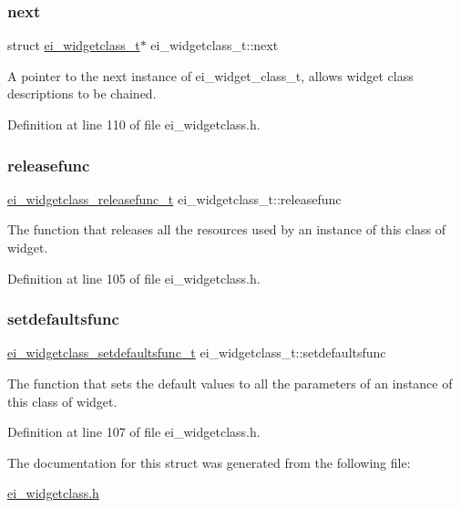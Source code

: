 \subsubsection{\texorpdfstring{next}{next}}
{\footnotesize\ttfamily struct \hyperlink{structei__widgetclass__t}{ei\+\_\+widgetclass\+\_\+t}$\ast$ ei\+\_\+widgetclass\+\_\+t\+::next}



A pointer to the next instance of ei\+\_\+widget\+\_\+class\+\_\+t, allows widget class descriptions to be chained. 



Definition at line 110 of file ei\+\_\+widgetclass.\+h.

\mbox{\label{structei__widgetclass__t_aebe6139b31816495e866c99ec3e83de6}} 
\subsubsection{\texorpdfstring{releasefunc}{releasefunc}}
{\footnotesize\ttfamily \hyperlink{ei__widgetclass_8h_a8fbcb8a5858722bd9454dc96b2c8f46c}{ei\+\_\+widgetclass\+\_\+releasefunc\+\_\+t} ei\+\_\+widgetclass\+\_\+t\+::releasefunc}



The function that releases all the resources used by an instance of this class of widget. 



Definition at line 105 of file ei\+\_\+widgetclass.\+h.

\mbox{\label{structei__widgetclass__t_a5fec706eefca10172d897cf61b268510}} 
\subsubsection{\texorpdfstring{setdefaultsfunc}{setdefaultsfunc}}
{\footnotesize\ttfamily \hyperlink{ei__widgetclass_8h_a6eb8e0ab7122c60cb5262a8cc72a3777}{ei\+\_\+widgetclass\+\_\+setdefaultsfunc\+\_\+t} ei\+\_\+widgetclass\+\_\+t\+::setdefaultsfunc}



The function that sets the default values to all the parameters of an instance of this class of widget. 



Definition at line 107 of file ei\+\_\+widgetclass.\+h.



The documentation for this struct was generated from the following file\+:\begin{DoxyCompactItemize}
\item 
\hyperlink{ei__widgetclass_8h}{ei\+\_\+widgetclass.\+h}\end{DoxyCompactItemize}
